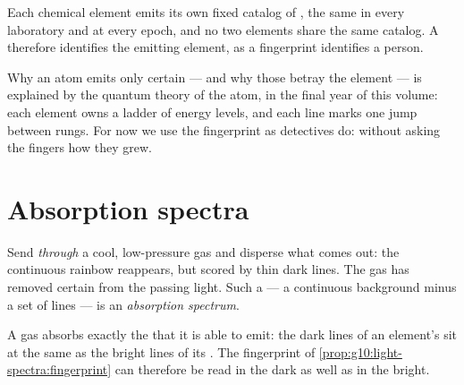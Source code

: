 \begin{proposition}\label{prop:g10:light-spectra:fingerprint}
Each chemical element emits its own fixed catalog of , the
same in every laboratory and at every epoch, and no two elements share
the same catalog. A  therefore identifies the emitting
element, as a fingerprint identifies a person.
\end{proposition}
\admitted

\begin{remark}\label{rem:g10:light-spectra:whylines}
Why an atom emits only certain  --- and why those 
betray the element --- is explained by the quantum theory of the atom, in
the final year of this volume: each element owns a ladder of energy
levels, and each line marks one jump between rungs. For now we use the
fingerprint as detectives do: without asking the fingers how they grew.
\end{remark}

\section{Absorption spectra}

\begin{definition}\label{def:g10:light-spectra:absorption}
Send  \emph{through} a cool, low-pressure gas and disperse
what comes out: the continuous rainbow reappears, but scored by thin dark
lines. The gas has removed certain  from the passing light.
Such a  --- a continuous background minus a set of lines --- is
an \emph{absorption spectrum}.
\end{definition}

\begin{proposition}\label{prop:g10:light-spectra:kirchhoff}
A gas absorbs exactly the  that it is able to emit: the dark
lines of an element's  sit at the same  as
the bright lines of its . The fingerprint of
\cref{prop:g10:light-spectra:fingerprint} can therefore be read in the
dark as well as in the bright.
\end{proposition}
\admitted


